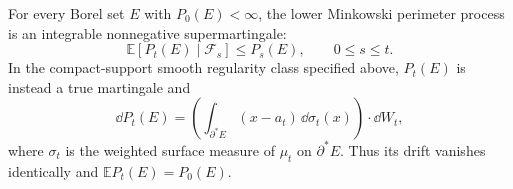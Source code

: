 \documentclass[../main.tex]{subfiles}
\begin{document}
\begin{lemma}
\label{lem:sol-perimeter-martingale}
For every Borel set $E$ with $P_0(E)<\infty$, the lower Minkowski perimeter process is an
integrable nonnegative supermartingale:
\begin{equation}
  \mathbb E[P_t(E)\mid\mathcal F_s]\leq P_s(E),\qquad 0\leq s\leq t.
  \label{eq:sol-perimeter-supermartingale}
\end{equation}
In the compact-support smooth regularity class specified above, $P_t(E)$ is instead a true
martingale and
\begin{equation}
  \dd P_t(E)
  =\left(\int_{\partial^*E}(x-a_t)\,\dd\sigma_t(x)\right)\mathbin\cdot\dd W_t,
  \label{eq:sol-perimeter-sde}
\end{equation}
where $\sigma_t$ is the weighted surface measure of $\mu_t$ on $\partial^*E$.  Thus its drift
vanishes identically and $\mathbb E P_t(E)=P_0(E)$.
\end{lemma}
\end{document}
